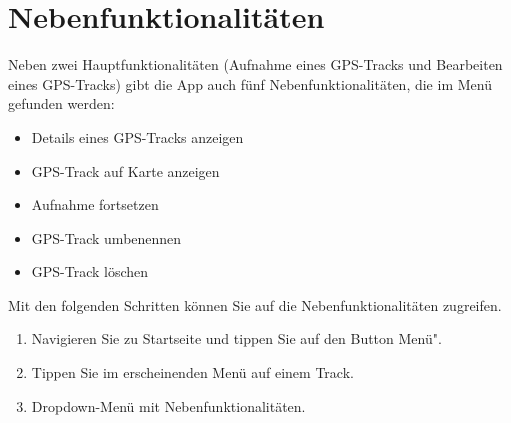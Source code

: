 \documentclass{article}
\begin{document}
    \newpage

\section{Nebenfunktionalitäten}
	Neben zwei Hauptfunktionalitäten (Aufnahme eines GPS-Tracks und Bearbeiten eines GPS-Tracks) gibt die App auch fünf Nebenfunktionalitäten, die im Menü gefunden werden: \\
	\begin{itemize}
		\item Details eines GPS-Tracks anzeigen
		\item GPS-Track auf Karte anzeigen
		\item Aufnahme fortsetzen
		\item GPS-Track umbenennen
		\item GPS-Track löschen	
	\end{itemize}
	Mit den folgenden Schritten können Sie auf die Nebenfunktionalitäten zugreifen.\\
	\begin{enumerate}
		\item Navigieren Sie zu Startseite und tippen Sie auf den Button \glqq Menü".
		\item Tippen Sie im erscheinenden Menü auf einem Track.
		\item Dropdown-Menü mit Nebenfunktionalitäten.
	\end{enumerate}		
\end{document}
